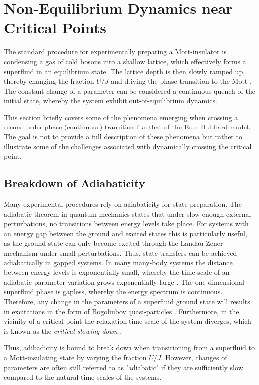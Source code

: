 \section{Non-Equilibrium Dynamics near Critical Points}
The standard procedure for experimentally preparing a Mott-insulator is condensing a gas of cold bosons into a shallow lattice, which effectively forms a superfluid in an equilibrium state. The lattice depth is then slowly ramped up, thereby changing the fraction $U/J$ and driving the phase transition to the Mott \cite{manybodyBloch,Greiner2002}. The constant change of a parameter can be considered a continuous quench of the initial state, whereby the system exhibit out-of-equilibrium dynamics.

This section briefly covers some of the phenomena emerging when crossing a second order phase (continuous) transition like that of the Bose-Hubbard model. The goal is not to provide a full description of these phenomena but rather to illustrate some of the challenges associated with dynamically crossing the critical point.

\subsection{Breakdown of Adiabaticity}
Many experimental procedures rely on adiabaticity for state preparation. The adiabatic theorem in quantum mechanics states that under slow enough external perturbations, no transitions between energy levels take place. For systems with an energy gap between the ground and excited states this is particularly useful, as the ground state can only become excited through the Landau-Zener mechanism \cite{Landau1932,Zener1932} under small perturbations. Thus, state transfers can be achieved adiabatically in gapped systems. In many many-body systems the distance between energy levels is exponentially small, whereby the time-scale of an adiabatic parameter variation grows exponentially large \cite{Polkovnikov2008}. The one-dimensional superfluid phase is gapless, whereby the energy spectrum is continuous. Therefore, any change in the parameters of a superfluid ground state will results in excitations in the form of Bogoliubov quasi-particles \cite{Polkovnikov2008,Ozeri2005}.
Furthermore, in the vicinity of a critical point the relaxation time-scale of the system diverges, which is known as the \textit{critical slowing down} \cite{Zurek2005}.

Thus, adibadicity is bound to break down when transitioning from a superfluid to a Mott-insulating state by varying the fraction $U/J$. However, changes of parameters are often still referred to as "adiabatic" if they are sufficiently slow compared to the natural time scales of the systems.

